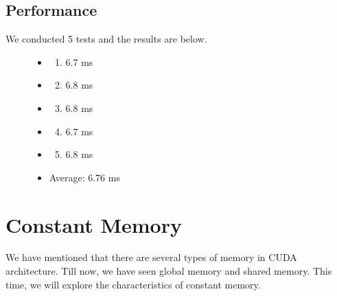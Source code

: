 \documentclass[letterpaper,10pt,english]{sphinxmanual}
\begin{document}
\subsection{Performance}
\label{RTACM/RTACM:performance}\begin{description}
\item[{We conducted 5 tests and the results are below.}] \leavevmode\begin{itemize}
\item {} \begin{enumerate}
\item {} 
6.7 ms

\end{enumerate}

\item {} \begin{enumerate}
\setcounter{enumi}{1}
\item {} 
6.8 ms

\end{enumerate}

\item {} \begin{enumerate}
\setcounter{enumi}{2}
\item {} 
6.8 ms

\end{enumerate}

\item {} \begin{enumerate}
\setcounter{enumi}{3}
\item {} 
6.7 ms

\end{enumerate}

\item {} \begin{enumerate}
\setcounter{enumi}{4}
\item {} 
6.8 ms

\end{enumerate}

\item {} 
Average: 6.76 ms

\end{itemize}

\end{description}


\section{Constant Memory}
\label{RTACM/RTACM:constant-memory}
We have mentioned that there are several types of memory in CUDA architecture. Till now, we have seen global memory and shared memory. This time, we will explore the characteristics of constant memory.
\end{document}
